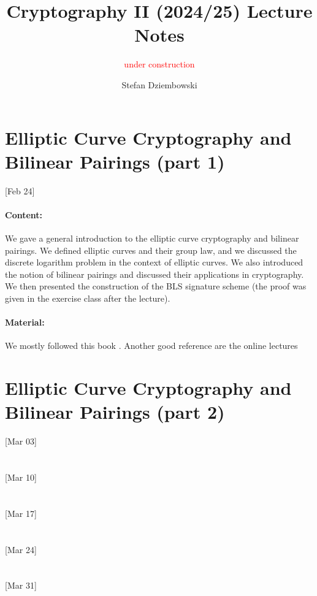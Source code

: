 \documentclass{llncs}
\title{Cryptography II (2024/25) Lecture Notes}
\subtitle{\textcolor{red}{under construction}}
\author{Stefan Dziembowski}
\institute{University of Warsaw}
\begin{document}
\maketitle

\section{Elliptic Curve Cryptography and Bilinear Pairings (part 1)}

[Feb 24]

\paragraph{Content:} We gave a general introduction to the elliptic curve cryptography and bilinear pairings. We defined elliptic curves and their group law, and we discussed the discrete logarithm problem in the context of elliptic curves. We also introduced the notion of bilinear pairings and discussed their applications in cryptography. We then presented the construction of the BLS signature scheme \cite{Boneh2001} (the proof was given in the exercise class after the lecture). 

\paragraph{Material:} We mostly followed this book \cite{Boneh2023}. Another good reference are the online lectures 



\section{Elliptic Curve Cryptography and Bilinear Pairings (part 2)}

[Mar 03]

\section{}
[Mar 10]

\section{}
[Mar 17]

\section{}
[Mar 24]

\section{}
[Mar 31]
\end{document}
